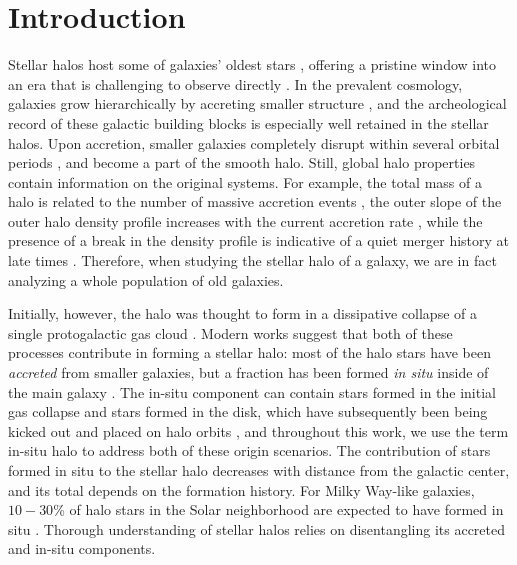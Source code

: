 \documentclass[apj, twocolappendix, numberedappendix, appendixfloats]{emulateapj}
\begin{document}
\section{Introduction}
Stellar halos host some of galaxies' oldest stars \citep{beers2005}, offering a pristine window into an era that is challenging to observe directly \citep{jwst}.
In the prevalent cosmology, galaxies grow hierarchically by accreting smaller structure \citep{white1978, diemand2008, springel2008, klypin2011}, and the archeological record of these galactic building blocks is especially well retained in the stellar halos.
Upon accretion, smaller galaxies completely disrupt within several orbital periods \citep{helmi1999b}, and become a part of the smooth halo.
Still, global halo properties contain information on the original systems.
For example, the total mass of a halo is related to the number of massive accretion events \citep{bj2005, cooper2010}, the outer slope of the outer halo density profile increases with the current accretion rate \citep{diemer2014}, while the presence of a break in the density profile is indicative of a quiet merger history at late times \citep{deason2013}.
Therefore, when studying the stellar halo of a galaxy, we are in fact analyzing a whole population of old galaxies.

Initially, however, the halo was thought to form in a dissipative collapse of a single protogalactic gas cloud \citep{els}.
Modern works suggest that both of these processes contribute in forming a stellar halo: most of the halo stars have been \emph{accreted} from smaller galaxies, but a fraction has been formed \emph{in situ} inside of the main galaxy \citep{zolotov2009, font2011, cooper2015}.
The in-situ component can contain stars formed in the initial gas collapse \citep{samland2003} and stars formed in the disk, which have subsequently been being kicked out and placed on halo orbits \citep{purcell2010}, and throughout this work, we use the term in-situ halo to address both of these origin scenarios.
The contribution of stars formed in situ to the stellar halo decreases with distance from the galactic center, and its total depends on the formation history.
For Milky Way-like galaxies, $10-30$\% of halo stars in the Solar neighborhood are expected to have formed in situ \citep{zolotov2009}. 
Thorough understanding of stellar halos relies on disentangling its accreted and in-situ components.
\end{document}
